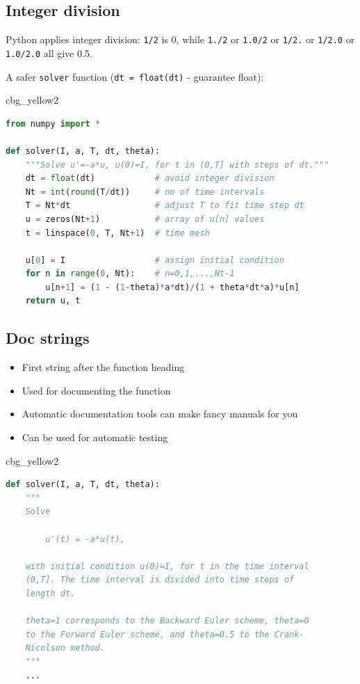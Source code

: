 \documentclass[%
oneside,                 %
final,                   %
10pt]{article}
\newenvironment{_cod_tight}[1]{
   \def\FrameCommand{\colorbox{#1}}
   \FrameRule0.6pt\MakeFramed {\FrameRestore}\vskip3mm}
   {\vskip0mm\endMakeFramed}
\newenvironment{cod}[1]{
\bgroup\rmfamily
\fboxsep=0mm\relax
\begin{_cod_tight}{#1}
\list{}{\parsep=-2mm\parskip=0mm\topsep=0pt\leftmargin=2mm
\rightmargin=2\leftmargin\leftmargin=4pt\relax}
\item\relax}
{\endlist\end{_cod_tight}\egroup}
\begin{document}
\subsection*{Integer division}

Python applies integer division: \texttt{1/2} is 0, while \texttt{1./2} or \texttt{1.0/2} or
\texttt{1/2.} or \texttt{1/2.0} or \texttt{1.0/2.0} all give 0.5.

A safer \texttt{solver} function (\texttt{dt = float(dt)} - guarantee float):

\begin{cod}{cbg_yellow2}\begin{lstlisting}[language=Python,style=simple,xleftmargin=2mm]
from numpy import *

def solver(I, a, T, dt, theta):
    """Solve u'=-a*u, u(0)=I, for t in (0,T] with steps of dt."""
    dt = float(dt)            # avoid integer division
    Nt = int(round(T/dt))     # no of time intervals
    T = Nt*dt                 # adjust T to fit time step dt
    u = zeros(Nt+1)           # array of u[n] values
    t = linspace(0, T, Nt+1)  # time mesh

    u[0] = I                  # assign initial condition
    for n in range(0, Nt):    # n=0,1,...,Nt-1
        u[n+1] = (1 - (1-theta)*a*dt)/(1 + theta*dt*a)*u[n]
    return u, t
\end{lstlisting}\end{cod}
\noindent


\subsection*{Doc strings}

\begin{itemize}
 \item First string after the function heading

 \item Used for documenting the function

 \item Automatic documentation tools can make fancy manuals for you

 \item Can be used for automatic testing
\end{itemize}

\noindent
\begin{cod}{cbg_yellow2}\begin{lstlisting}[language=Python,style=simple,xleftmargin=2mm]
def solver(I, a, T, dt, theta):
    """
    Solve

        u'(t) = -a*u(t),

    with initial condition u(0)=I, for t in the time interval
    (0,T]. The time interval is divided into time steps of
    length dt.

    theta=1 corresponds to the Backward Euler scheme, theta=0
    to the Forward Euler scheme, and theta=0.5 to the Crank-
    Nicolson method.
    """
    ...
\end{lstlisting}\end{cod}
\noindent
\end{document}

